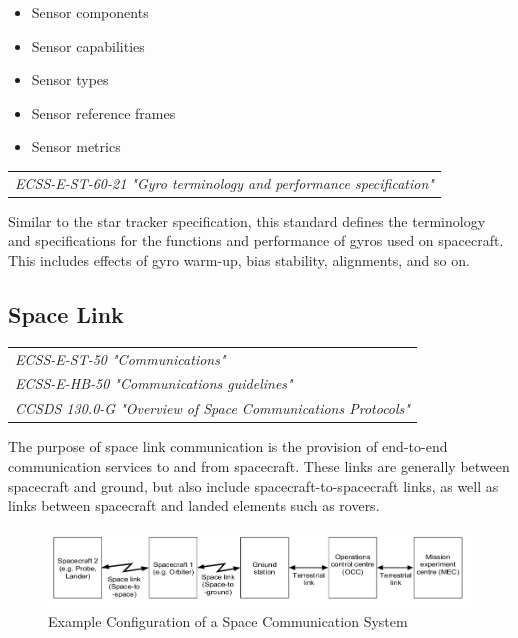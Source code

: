 \begin{itemize}
\item Sensor components
\item Sensor capabilities
\item Sensor types
\item Sensor reference frames
\item Sensor metrics
\end{itemize}

\begin{tabular}{l}
\textit{ECSS-E-ST-60-21 "Gyro terminology and performance specification" \cite{ECSS-E-ST-60-21}} \\
\end{tabular}

Similar to the star tracker specification, this standard defines the terminology and specifications for the functions and performance of gyros used on spacecraft. This includes effects of gyro warm-up, bias stability, alignments, and so on. 


\subsection{Space Link}
\label{sec:Space Link}

\begin{tabular}{l}
\textit{ECSS-E-ST-50 "Communications" \cite{ECSS-E-ST-50}} \\
\textit{ECSS-E-HB-50 "Communications guidelines" \cite{ECSS-E-HB-50}} \\
\textit{CCSDS 130.0-G "Overview of Space Communications Protocols" \cite{CCSDS 130.0-G}}
\end{tabular}

The purpose of space link communication is the provision of end-to-end communication services to and from spacecraft. These links are generally between spacecraft and ground, but also include spacecraft-to-spacecraft links, as well as links between spacecraft and landed elements such as rovers. 

\begin{figure}[h]
\centering\includegraphics[scale=0.4]{fig/example_configuration_of_a_space_communication_system}
\caption{Example Configuration of a Space Communication System}
\label{fig:Example Configuration of a Space Communication System}
\end{figure}

